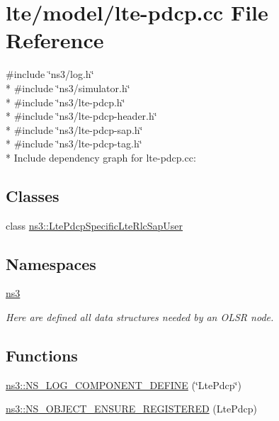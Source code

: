 \hypertarget{lte-pdcp_8cc}{}\section{lte/model/lte-\/pdcp.cc File Reference}
\label{lte-pdcp_8cc}
{\ttfamily \#include \char`\"{}ns3/log.\+h\char`\"{}}\\*
{\ttfamily \#include \char`\"{}ns3/simulator.\+h\char`\"{}}\\*
{\ttfamily \#include \char`\"{}ns3/lte-\/pdcp.\+h\char`\"{}}\\*
{\ttfamily \#include \char`\"{}ns3/lte-\/pdcp-\/header.\+h\char`\"{}}\\*
{\ttfamily \#include \char`\"{}ns3/lte-\/pdcp-\/sap.\+h\char`\"{}}\\*
{\ttfamily \#include \char`\"{}ns3/lte-\/pdcp-\/tag.\+h\char`\"{}}\\*
Include dependency graph for lte-\/pdcp.cc\+:
\subsection*{Classes}
\begin{DoxyCompactItemize}
\item 
class \hyperlink{classns3_1_1LtePdcpSpecificLteRlcSapUser}{ns3\+::\+Lte\+Pdcp\+Specific\+Lte\+Rlc\+Sap\+User}
\end{DoxyCompactItemize}
\subsection*{Namespaces}
\begin{DoxyCompactItemize}
\item 
 \hyperlink{namespacens3}{ns3}
\begin{DoxyCompactList}\small\item\em Here are defined all data structures needed by an O\+L\+SR node. \end{DoxyCompactList}\end{DoxyCompactItemize}
\subsection*{Functions}
\begin{DoxyCompactItemize}
\item 
\hyperlink{namespacens3_a86ff63bc96ed6329a8759e67edfd2063}{ns3\+::\+N\+S\+\_\+\+L\+O\+G\+\_\+\+C\+O\+M\+P\+O\+N\+E\+N\+T\+\_\+\+D\+E\+F\+I\+NE} (\char`\"{}Lte\+Pdcp\char`\"{})
\item 
\hyperlink{namespacens3_a91fad022a437ef6d7142ec37debbfd47}{ns3\+::\+N\+S\+\_\+\+O\+B\+J\+E\+C\+T\+\_\+\+E\+N\+S\+U\+R\+E\+\_\+\+R\+E\+G\+I\+S\+T\+E\+R\+ED} (Lte\+Pdcp)
\end{DoxyCompactItemize}
